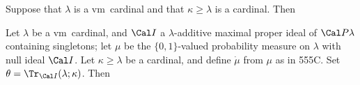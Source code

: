 Suppose that $\lambda$ is a \2vm\ cardinal and
that $\kappa\ge\lambda$ is a cardinal.   Then



 Let $\lambda$ be a \2vm\ cardinal, and $\Cal I$
a $\lambda$-additive maximal proper ideal of $\Cal P\lambda$ containing
singletons;  let $\mu$ be the $\{0,1\}$-valued probability measure on
$\lambda$ with null ideal $\Cal I$.
Let $\kappa\ge\lambda$ be a cardinal, and define $\dot\mu$ from $\mu$ as
in 555C.   Set
$\theta=\Tr_{\Cal I}(\lambda;\kappa)$.
Then


